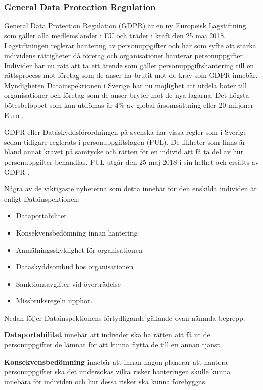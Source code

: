 \documentclass[a4paper,12pt]{article}
\begin{document}
 \subsubsection{General Data Protection Regulation}\label{GDPR}
 General Data Protection Regulation (GDPR) är en ny Europeisk Lagstiftning som gäller alla medlemsländer i EU och träder i kraft den 25 maj 2018.
 Lagstiftningen reglerar hantering av personuppgifter och har som syfte att stärka individens rättigheter då företag och organisationer hanterar personuppgifter \cite{GDPRibm} \cite{GDPRdatainspektionen}.
 Individer har nu rätt att ta ett ärende som gäller personuppgiftshantering till en rättsprocess mot företag som de anser ha brutit mot de krav som GDPR innebär.
 Myndigheten Datainspektionen i Sverige har nu möjlighet att utdela böter till organisationer och företag som de anser bryter mot de nya lagarna. Det högsta bötesbeloppet som kan utdömas är 4\% av global årsomsättning eller 20 miljoner Euro \cite{GDPRibm}.

 GDPR eller Dataskyddsförordningen på svenska har vissa regler som i Sverige sedan tidigare reglerats i personuppgiftslagen (PUL). De likheter som finns är bland annat kravet på samtycke och rätten för en individ att få ta del av hur personuppgifter behandlas. PUL utgår den 25 maj 2018 i sin helhet och ersätts av GDPR \cite{GDPRdatainspektionen}.

 Några av de viktigaste nyheterna som detta innebär för den enskilda individen är enligt Datainspektionen\cite{GDPRdatainspektionen}:
 \begin{itemize}
   \item Dataportabilitet
   \item Konsekvensbedömning innan hantering
   \item Anmälningsskyldighet för organisationen
   \item Dataskyddsombud hos organisationen
   \item Sanktionsavgifter vid överträdelse
   \item Missbruksregeln upphör.
 \end{itemize}

 Nedan följer Datainspektionens \cite{GDPRdatainspektionen} förtydligande gällande ovan nämnda begrepp.

 \textbf{Dataportabilitet} innebär att individer ska ha rätten att få ut de personuppgifter de lämnat för att kunna flytta de till en annan tjänst.

 \textbf{Konsekvensbedömning} innebär att innan någon planerar att hantera personuppgifter ska det undersökas vilka risker hanteringen skulle kunna innebära för individen och hur dessa risker ska kunna förebyggas.
\end{document}
